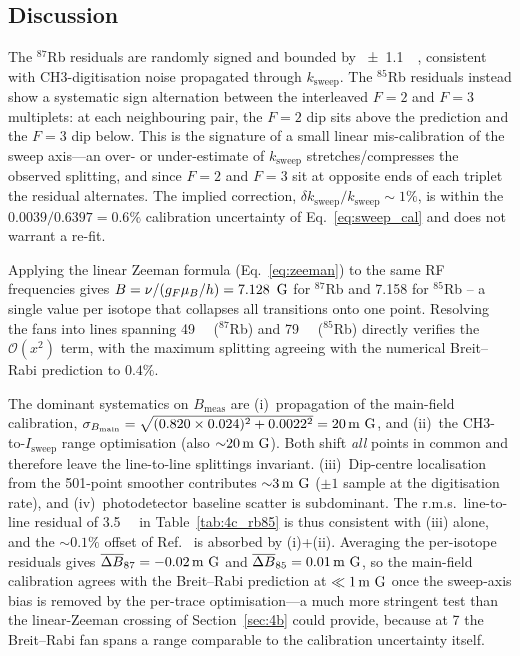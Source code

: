 \subsection{Discussion}
The $^{87}$Rb residuals are randomly signed and bounded by
\SI{\pm 1.1}{\milli\gauss}, consistent with CH3-digitisation noise
propagated through $k_{\mathrm{sweep}}$. The $^{85}$Rb residuals instead
show a systematic sign alternation between the interleaved $F=2$ and $F=3$
multiplets: at each neighbouring pair, the $F=2$ dip sits above the
prediction and the $F=3$ dip below. This is the signature of a small
linear mis-calibration of the sweep axis---an over- or under-estimate of
$k_{\mathrm{sweep}}$ stretches/compresses the observed splitting, and
since $F=2$ and $F=3$ sit at opposite ends of each triplet the residual
alternates. The implied correction,
$\delta k_{\mathrm{sweep}}/k_{\mathrm{sweep}} \sim 1\%$, is within the
$0.0039/0.6397 = 0.6\%$ calibration uncertainty of Eq.~\ref{eq:sweep_cal}
and does not warrant a re-fit.

Applying the linear Zeeman formula (Eq.~\ref{eq:zeeman}) to the same RF
frequencies gives $B = \nu/(g_F\mu_B/h) = \SI{7.128}{\ \text{G}}$ for $^{87}$Rb
and \SI{7.158}{\gauss} for $^{85}$Rb -- a single value per isotope that
collapses all transitions onto one point. Resolving the fans into lines
spanning \SI{49}{\milli\gauss} ($^{87}$Rb) and \SI{79}{\milli\gauss}
($^{85}$Rb) directly verifies the $\mathcal{O}(x^2)$ term, with the
maximum splitting agreeing with the numerical Breit--Rabi prediction to
$0.4\%$.

The dominant systematics on $B_{\mathrm{meas}}$ are (i)~propagation of the
main-field calibration,
$\sigma_{B_{\mathrm{main}}} = \sqrt{(0.820 \times 0.024)^2 + 0.0022^2} =
\SI{20}{\milli\ \text{G}}$, and (ii)~the CH3-to-$I_{\mathrm{sweep}}$ range
optimisation (also ${\sim}\SI{20}{\milli\ \text{G}}$). Both shift \emph{all}
points in common and therefore leave the line-to-line splittings
invariant. (iii)~Dip-centre localisation from the 501-point smoother
contributes ${\sim}\SI{3}{\milli\ \text{G}}$ ($\pm 1$ sample at the
digitisation rate), and (iv)~photodetector baseline scatter is
subdominant. The r.m.s.\ line-to-line residual of
\SI{3.5}{\milli\gauss} in Table~\ref{tab:4c_rb85} is thus consistent with
(iii) alone, and the ${\sim}0.1\%$ offset of
Ref.~\cite{OpticalPumpingRubidium2002} is absorbed by (i)+(ii). Averaging
the per-isotope residuals gives
$\overline{\Delta B}_{87} = \SI{-0.02}{\milli\ \text{G}}$ and
$\overline{\Delta B}_{85} = \SI{+0.01}{\milli\ \text{G}}$, so the main-field
calibration agrees with the Breit--Rabi prediction at
$\ll\SI{1}{\milli\ \text{G}}$ once the sweep-axis bias is removed by the
per-trace optimisation---a much more stringent test than the
linear-Zeeman crossing of Section~\ref{sec:4b} could provide, because at
\SI{7}{\gauss} the Breit--Rabi fan spans a range comparable to the
calibration uncertainty itself.
